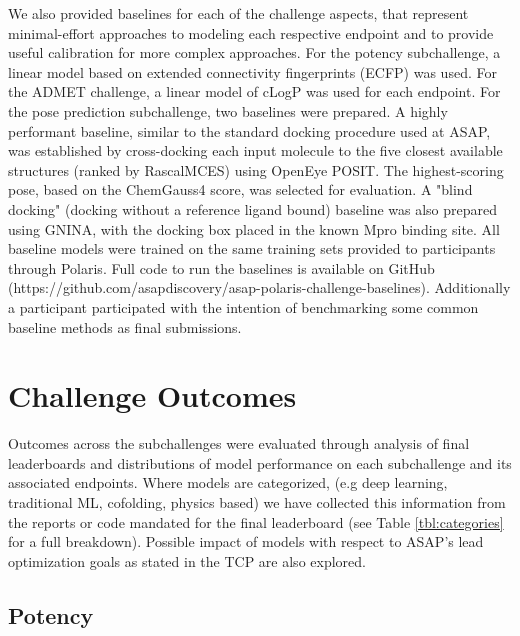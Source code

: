 \documentclass[journal=jcim,manuscript=article]{achemso}
\begin{document}
We also provided baselines for each of the challenge aspects, that represent minimal-effort approaches to modeling each respective endpoint and to provide useful calibration for more complex approaches. For the potency subchallenge, a linear model based on extended connectivity fingerprints (ECFP)\cite{ecfp_2010} was used. For the ADMET challenge, a linear model of cLogP\cite{clogp_1999} was used for each endpoint. For the pose prediction subchallenge, two baselines were prepared. A highly performant baseline, similar to the standard docking procedure used at ASAP, was established by cross-docking each input molecule to the five closest available structures (ranked by RascalMCES\cite{raymond_rascal_2002, rdkit}) using OpenEye POSIT\cite{kelley_posit_2015}. The highest-scoring pose, based on the ChemGauss4\cite{oetk} score, was selected for evaluation. A "blind docking" (docking without a reference ligand bound) baseline was also prepared using GNINA\cite{mcnutt_gnina_2025}, with the docking box placed in the known Mpro binding site. All baseline models were trained on the same training sets provided to participants through Polaris. Full code to run the baselines is available on GitHub (https://github.com/asapdiscovery/asap-polaris-challenge-baselines). Additionally a participant participated with the intention of benchmarking some common baseline methods as final submissions\cite{beauty_baseline_2025}. 

\section{Challenge Outcomes}

Outcomes across the subchallenges were evaluated through analysis of final leaderboards and distributions of model performance on each subchallenge and its associated endpoints. Where models are categorized, (e.g deep learning, traditional ML, cofolding, physics based) we have collected this information from the reports or code mandated for the final leaderboard (see Table \ref{tbl:categories} for a full breakdown). Possible impact of models with respect to ASAP's lead optimization goals as stated in the TCP\cite{sars_mers_tcp} are also explored. 

\subsection{Potency}
\end{document}
